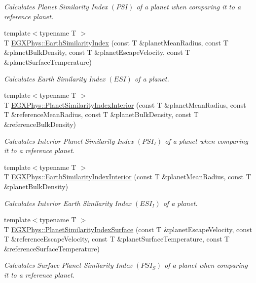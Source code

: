 \begin{DoxyCompactItemize}
\begin{DoxyCompactList}\small\item\em Calculates Planet Similarity Index $(PSI)$ of a planet when comparing it to a reference planet. \end{DoxyCompactList}\item 
{\footnotesize template$<$typename T $>$ }\\T \mbox{\hyperlink{group___astrophysics_ga4b86397b1c839c49ac599d49fda207d4}{E\+G\+X\+Phys\+::\+Earth\+Similarity\+Index}} (const T \&planet\+Mean\+Radius, const T \&planet\+Bulk\+Density, const T \&planet\+Escape\+Velocity, const T \&planet\+Surface\+Temperature)
\begin{DoxyCompactList}\small\item\em Calculates Earth Similarity Index $(ESI)$ of a planet. \end{DoxyCompactList}\item 
{\footnotesize template$<$typename T $>$ }\\T \mbox{\hyperlink{group___astrophysics_ga6dc06a1a8baf6e132abed51fcf410c7f}{E\+G\+X\+Phys\+::\+Planet\+Similarity\+Index\+Interior}} (const T \&planet\+Mean\+Radius, const T \&reference\+Mean\+Radius, const T \&planet\+Bulk\+Density, const T \&reference\+Bulk\+Density)
\begin{DoxyCompactList}\small\item\em Calculates Interior Planet Similarity Index $(PSI_I)$ of a planet when comparing it to a reference planet. \end{DoxyCompactList}\item 
{\footnotesize template$<$typename T $>$ }\\T \mbox{\hyperlink{group___astrophysics_ga699bcc2f17b8855eaa856595d8032f61}{E\+G\+X\+Phys\+::\+Earth\+Similarity\+Index\+Interior}} (const T \&planet\+Mean\+Radius, const T \&planet\+Bulk\+Density)
\begin{DoxyCompactList}\small\item\em Calculates Interior Earth Similarity Index $(ESI_I)$ of a planet. \end{DoxyCompactList}\item 
{\footnotesize template$<$typename T $>$ }\\T \mbox{\hyperlink{group___astrophysics_gae0c7dce2779d66b0560ca388a34ddc39}{E\+G\+X\+Phys\+::\+Planet\+Similarity\+Index\+Surface}} (const T \&planet\+Escape\+Velocity, const T \&reference\+Escape\+Velocity, const T \&planet\+Surface\+Temperature, const T \&reference\+Surface\+Temperature)
\begin{DoxyCompactList}\small\item\em Calculates Surface Planet Similarity Index $(PSI_S)$ of a planet when comparing it to a reference planet. \end{DoxyCompactList}\item 

\end{DoxyCompactItemize}
